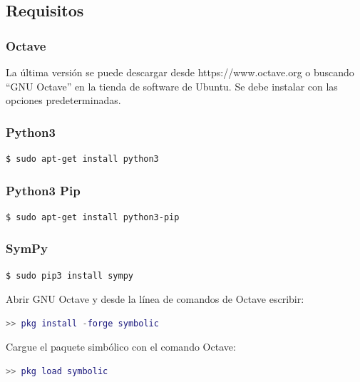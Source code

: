 \documentclass[12pt]{article}
\begin{document}
\subsection{Requisitos}

\subsubsection{Octave}\label{ins-octave}
La última versión se puede descargar desde https://www.octave.org o buscando “GNU Octave” en la tienda de software de Ubuntu. Se debe instalar con las opciones predeterminadas.

\subsubsection{Python3}
\begin{lstlisting}[language=bash]
  $ sudo apt-get install python3
\end{lstlisting}
\subsubsection{Python3 Pip}
\begin{lstlisting}[language=bash]
  $ sudo apt-get install python3-pip
\end{lstlisting}

\subsubsection{SymPy}
\begin{lstlisting}[language=bash]
  $ sudo pip3 install sympy
\end{lstlisting}
Abrir GNU Octave y desde la línea de comandos de Octave escribir:
\begin{lstlisting}[language=matlab]
  >> pkg install -forge symbolic
\end{lstlisting}
Cargue el paquete simbólico con el comando Octave:
\begin{lstlisting}[language=matlab]
  >> pkg load symbolic
\end{lstlisting}

\pagebreak
\end{document}
